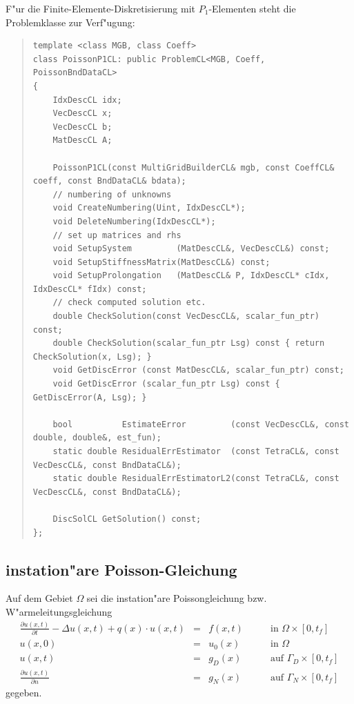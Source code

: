\documentclass[11pt,a4paper]{article}
\newenvironment{Code}{\begin{quote}\scriptsize}{\end{quote}}
\begin{document}
F"ur die Finite-Elemente-Diskretisierung mit $P_1$-Elementen steht die
Problemklasse  zur Verf"ugung:
\begin{Code}
\begin{verbatim}
template <class MGB, class Coeff>
class PoissonP1CL: public ProblemCL<MGB, Coeff, PoissonBndDataCL>
{
    IdxDescCL idx;
    VecDescCL x;
    VecDescCL b;
    MatDescCL A;
    
    PoissonP1CL(const MultiGridBuilderCL& mgb, const CoeffCL& coeff, const BndDataCL& bdata);
    // numbering of unknowns
    void CreateNumbering(Uint, IdxDescCL*);
    void DeleteNumbering(IdxDescCL*);
    // set up matrices and rhs
    void SetupSystem         (MatDescCL&, VecDescCL&) const;
    void SetupStiffnessMatrix(MatDescCL&) const;
    void SetupProlongation   (MatDescCL& P, IdxDescCL* cIdx, IdxDescCL* fIdx) const;
    // check computed solution etc.
    double CheckSolution(const VecDescCL&, scalar_fun_ptr) const;
    double CheckSolution(scalar_fun_ptr Lsg) const { return CheckSolution(x, Lsg); }
    void GetDiscError (const MatDescCL&, scalar_fun_ptr) const;
    void GetDiscError (scalar_fun_ptr Lsg) const { GetDiscError(A, Lsg); }

    bool          EstimateError         (const VecDescCL&, const double, double&, est_fun);
    static double ResidualErrEstimator  (const TetraCL&, const VecDescCL&, const BndDataCL&);
    static double ResidualErrEstimatorL2(const TetraCL&, const VecDescCL&, const BndDataCL&);

    DiscSolCL GetSolution() const;
};
\end{verbatim}
\end{Code}

\subsection{instation"are Poisson-Gleichung}
Auf dem Gebiet $\Omega$ sei die instation"are Poissongleichung bzw.
W"armeleitungsgleichung
\[
\begin{array}{rcll}
    \frac{\partial u(x,t)}{\partial t}-\Delta u(x,t) + q(x)\cdot u(x,t) &=& f(x,t) 
    & \qquad\mbox{in }\Omega\times[0,t_f]\\
    u(x,0) &=& u_0(x) & \qquad\mbox{in }\Omega\\
    u(x,t) &=& g_D(x) & \qquad\mbox{auf }\Gamma_D\times[0,t_f]\\
    \frac{\partial u(x,t)}{\partial n} &=& g_N(x) 
    & \qquad\mbox{auf }\Gamma_N\times[0,t_f]
\end{array}
\]
gegeben.
\end{document}
